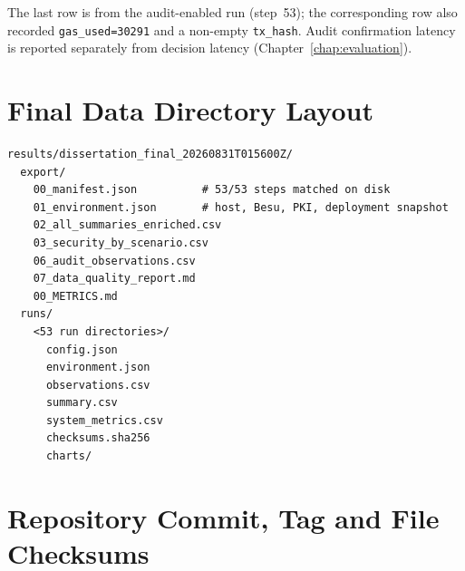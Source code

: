 \noindent
The last row is from the audit-enabled run (step~53); the corresponding row also recorded \texttt{gas\_used=30291} and a non-empty \texttt{tx\_hash}. Audit confirmation latency is reported separately from decision latency (Chapter~\ref{chap:evaluation}).

\section{Final Data Directory Layout}
\label{app:data-layout}

\begin{lstlisting}[style=csv,caption={Corrected Chapter~5 evidence package layout},label=lst:data-tree,numbers=none]
results/dissertation_final_20260831T015600Z/
  export/
    00_manifest.json          # 53/53 steps matched on disk
    01_environment.json       # host, Besu, PKI, deployment snapshot
    02_all_summaries_enriched.csv
    03_security_by_scenario.csv
    06_audit_observations.csv
    07_data_quality_report.md
    00_METRICS.md
  runs/
    <53 run directories>/
      config.json
      environment.json
      observations.csv
      summary.csv
      system_metrics.csv
      checksums.sha256
      charts/
\end{lstlisting}

\section{Repository Commit, Tag and File Checksums}
\label{app:reproducibility}

